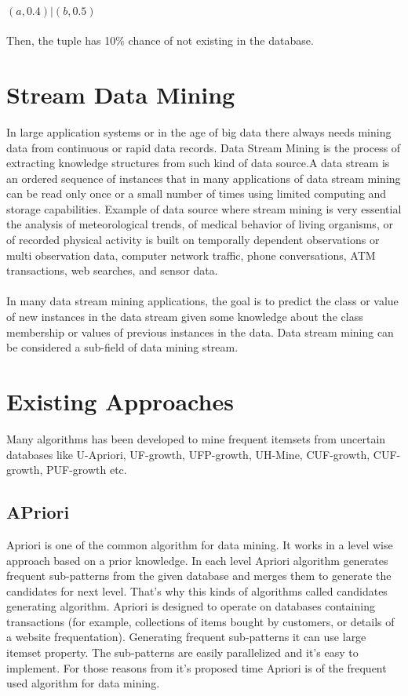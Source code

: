 \documentclass[a4paper,12pt]{book}
\begin{document}
\paragraph{}
$(a, 0.4) | (b, 0.5)$
\paragraph{}
Then, the tuple has 10\% chance of not existing in the database.



\section{Stream Data Mining}
In large application systems or in the age of big data there always needs mining data from continuous or rapid data records. Data Stream Mining is the process of extracting knowledge structures from such kind of data source.A data stream is an ordered sequence of instances that in many applications of data stream mining can be read only once or a small number of times using limited computing and storage capabilities. Example of data source where stream mining is very essential the analysis of meteorological trends, of medical behavior of living organisms, or of recorded physical activity is built on temporally dependent observations or multi observation data, computer network traffic, phone conversations, ATM transactions, web searches, and sensor data.

\paragraph{}
In many data stream mining applications, the goal is to predict the class or value of new instances in the data stream given some knowledge about the class membership or values of previous instances in the data. Data stream mining can be considered a sub-field of data mining stream.
\section{Existing Approaches}
Many algorithms has been developed to mine frequent itemsets from uncertain databases like U-Apriori, UF-growth, UFP-growth, UH-Mine, CUF-growth, CUF-growth, PUF-growth etc.
\subsection{APriori}
Apriori is one of the common algorithm for data mining. It works in a level wise approach based on a prior knowledge. In each level Apriori algorithm generates frequent sub-patterns from the given database and merges them to generate the candidates for next level. That's why this kinds of algorithms called candidates generating algorithm.  Apriori is designed to operate on databases containing transactions (for example, collections of items bought by customers, or details of a website frequentation). Generating frequent sub-patterns it can use large itemset property. The sub-patterns are easily parallelized and it's easy to implement. For those reasons from it's proposed time Apriori is of the frequent used algorithm for data mining.
\end{document}
